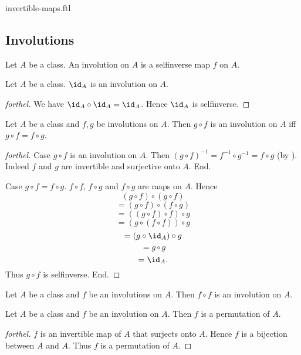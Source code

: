\documentclass{naproche-library}
\begin{document}
\begin{smodule}{invertible-maps.ftl}
  \subsection*{Involutions}

  \begin{definition}[forthel,id=FOUNDATIONS_09_7282039688527872]
    Let $A$ be a class.
    An involution on $A$ is a selfinverse map $f$ on $A$.
  \end{definition}

  \begin{proposition}[forthel,id=FOUNDATIONS_09_7944474185433088]
    Let $A$ be a class.
    $\id_{A}$ is an involution on $A$.
  \end{proposition}
  \begin{proof}[forthel]
    We have $\id_{A} \circ \id_{A} = \id_{A}$.
    Hence $\id_{A}$ is selfinverse.
  \end{proof}

  \begin{proposition}[forthel,id=FOUNDATIONS_09_6897019612299264]
    Let $A$ be a class and $f, g$ be involutions on $A$.
    Then $g \circ f$ is an involution on $A$ iff $g \circ f = f \circ g$.
  \end{proposition}
  \begin{proof}[forthel]
    Case $g \circ f$ is an involution on $A$.
      Then $(g \circ f)^{-1}
        = f^{-1} \circ g^{-1}
        = f \circ g$
      (by ).
      Indeed $f$ and $g$ are invertible and surjective onto $A$.
    End.

    Case $g \circ f = f \circ g$.
      $f \circ f$, $f \circ g$ and $f \circ g$ are maps on $A$.
      Hence
      \[  (g \circ f) \circ (g \circ f)       \]
      \[    = (g \circ f) \circ (f \circ g)   \]
      \[    = ((g \circ f) \circ f) \circ g   \]
      \[    = (g \circ (f \circ f)) \circ g   \]
      \[    = (g \circ \id_{A}) \circ g       \]
      \[    = g \circ g                       \]
      \[    = \id_{A}.                        \]
      Thus $g \circ f$ is selfinverse.
    End.
  \end{proof}

  \begin{corollary}[forthel,id=FOUNDATIONS_09_5958206868160512]
    Let $A$ be a class and $f$ be an involutions on $A$.
    Then $f \circ f$ is an involution on $A$.
  \end{corollary}

  \begin{proposition}[forthel,id=FOUNDATIONS_09_2314262743613440]
    Let $A$ be a class and $f$ be an involution on $A$.
    Then $f$ is a permutation of $A$.
  \end{proposition}
  \begin{proof}[forthel]
    $f$ is an invertible map of $A$ that surjects onto $A$.
    Hence $f$ is a bijection between $A$ and $A$.
    Thus $f$ is a permutation of $A$.
  \end{proof}
\end{smodule}
\end{document}
